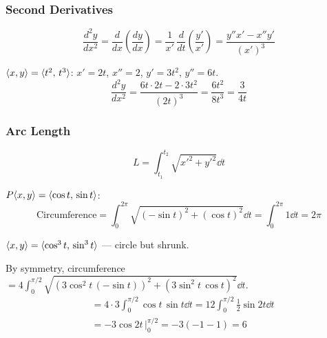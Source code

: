 \subsubsection{Second Derivatives}

\[
  \frac{d^{2}y}{dx^{2}}
  = \frac{d}{dx}\!\left(\frac{dy}{dx}\right)
  = \frac{1}{x'}\,\frac{d}{dt}\!\left(\frac{y'}{x'}\right)
  = \frac{y''x' - x''y'}{(x')^{3}}
\]

\begin{example}
  $\langle x,y \rangle = \langle t^{2},\, t^{3} \rangle$: \quad $x' = 2t$, $x'' = 2$, $y' = 3t^{2}$, $y'' = 6t$.
  \[
    \frac{d^{2}y}{dx^{2}}
    = \frac{6t\cdot 2t - 2\cdot 3t^{2}}{(2t)^{3}}
    = \frac{6t^{2}}{8t^{3}}
    = \frac{3}{4t}
  \]
\end{example}

\subsubsection{Arc Length}

\[
  L = \int_{t_{1}}^{t_{2}} \sqrt{x'^{2} + y'^{2}} \dd{t}
\]

\begin{example}[Circle]
  $P\langle x,y \rangle = \langle \cos t,\, \sin t \rangle$:
  \[
    \text{Circumference}
    = \int_{0}^{2\pi}\sqrt{(-\sin t)^{2}+(\cos t)^{2}}\dd{t}
    = \int_{0}^{2\pi} 1\dd{t}
    = 2\pi
  \]
\end{example}

\begin{example}[Astroid]
  $\langle x,y \rangle = \langle \cos^{3}t,\, \sin^{3}t \rangle$ --- circle but shrunk.

  \begin{center}
  \end{center}

  By symmetry, circumference $= 4\displaystyle\int_{0}^{\pi/2}
    \sqrt{(3\cos^{2}t\,(-\sin t))^{2}+(3\sin^{2}t\,\cos t)^{2}}\dd{t}$.
  \begin{align*}
     & = 4\cdot 3\int_{0}^{\pi/2}\cos t\,\sin t\dd{t}
    = 12\int_{0}^{\pi/2}\tfrac{1}{2}\sin 2t\dd{t}     \\
     & = -3\cos 2t\,\Big|_{0}^{\pi/2}
    = -3(-1-1) = 6
  \end{align*}
\end{example}

